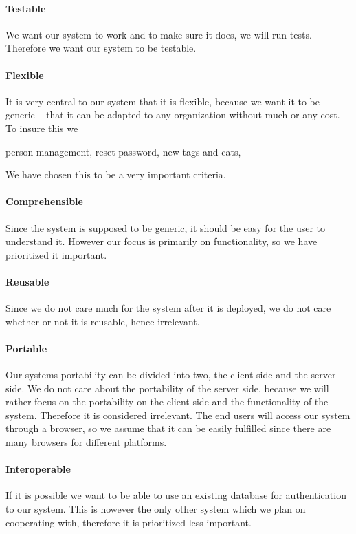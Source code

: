 \paragraph{Testable}
We want our system to work and to make sure it does, we will run tests.
Therefore we want our system to be testable.
\paragraph{Flexible}


It is very central to our system that it is flexible, because we want it to be generic -- that it can be adapted to any organization without much or any cost. To insure this we 

person management, reset password, new tags and cats, 

We have chosen this to be a very important criteria.
\paragraph{Comprehensible}
Since the \hdesk[] system is supposed to be generic, it should be easy for the user to understand it.
However our focus is primarily on functionality, so we have prioritized it important.
\paragraph{Reusable}
Since we do not care much for the system after it is deployed, we do not care whether or not it is reusable, hence irrelevant.
\paragraph{Portable}
Our systems portability can be divided into two, the client side and the server side.
We do not care about the portability of the server side, because we will rather focus on the portability on the client side and the functionality of the system.
Therefore it is considered irrelevant.
The end users will access our system through a browser, so we assume that it can be easily fulfilled since there are many browsers for different platforms. \cite{chrome10} 
\paragraph{Interoperable}
If it is possible we want to be able to use an existing database for authentication to our system.
This is however the only other system which we plan on cooperating with, therefore it is prioritized less important.